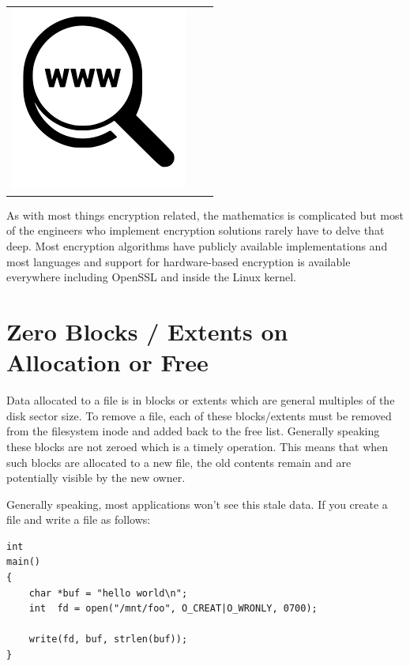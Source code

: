 \begin{table}[h]
\begin{tabular}{lcl}
\parbox[r]{0.5in}{\includegraphics[scale=0.15]{figures/url.png}} & \parbox[l]{0.1in}{} & \parbox[l]{3in}{}
\end{tabular}
\end{table}

\noindent
As with most things encryption related, the mathematics is complicated but most of the engineers who implement encryption solutions rarely have to delve that deep. Most encryption algorithms have publicly available implementations and most languages and support for hardware-based encryption is available everywhere including OpenSSL and inside the Linux kernel. 

\section{Zero Blocks / Extents on Allocation or Free}

Data allocated to a file is in blocks or extents which are general multiples of the disk sector size. To remove a file, each of these blocks/extents must be removed from the filesystem inode and added back to the free list. Generally speaking these blocks are not zeroed which is a timely operation. This means that when such blocks are allocated to a new file, the old contents remain and are potentially visible by the new owner.

Generally speaking, most applications won't see this stale data. If you create a file and write a file as follows:

\begin{lstlisting}
int
main()
{
    char *buf = "hello world\n";
    int  fd = open("/mnt/foo", O_CREAT|O_WRONLY, 0700);

    write(fd, buf, strlen(buf));
}
\end{lstlisting}

